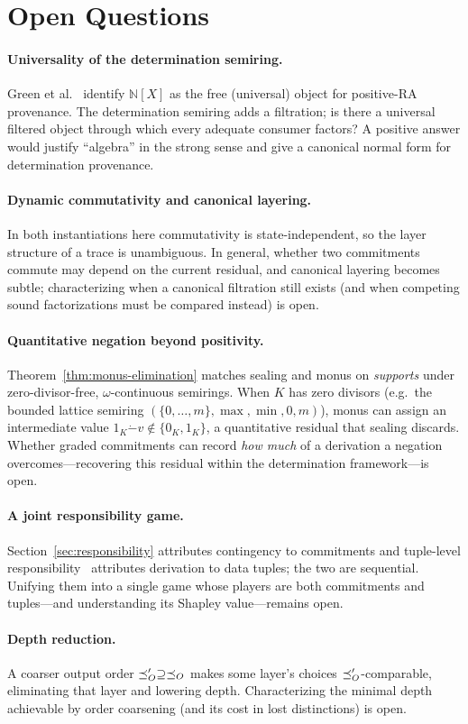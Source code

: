 \section{Open Questions}
\label{app:open-questions}

\paragraph{Universality of the determination semiring.}
Green et al.~\cite{green2007provenance} identify $\mathbb{N}[X]$ as the free
(universal) object for positive-RA provenance. The determination semiring adds
a filtration; is there a universal filtered object through which every
adequate consumer factors? A positive answer would justify ``algebra'' in the
strong sense and give a canonical normal form for determination provenance.

\paragraph{Dynamic commutativity and canonical layering.}
In both instantiations here commutativity is state-independent, so the layer
structure of a trace is unambiguous. In general, whether two commitments
commute may depend on the current residual, and canonical layering becomes
subtle; characterizing when a canonical filtration still exists (and when
competing sound factorizations must be compared instead) is open.

\paragraph{Quantitative negation beyond positivity.}
Theorem~\ref{thm:monus-elimination} matches sealing and monus on
\emph{supports} under zero-divisor-free, $\omega$-continuous semirings. When
$K$ has zero divisors (e.g.\ the bounded lattice semiring
$(\{0,\dots,m\}, \max, \min, 0, m)$), monus can assign an intermediate value
$1_K \mathbin{\dot{-}} v \notin \{0_K, 1_K\}$, a quantitative residual that
sealing discards. Whether graded commitments can record \emph{how much} of a
derivation a negation overcomes---recovering this residual within the
determination framework---is open.

\paragraph{A joint responsibility game.}
Section~\ref{sec:responsibility} attributes contingency to commitments and
tuple-level responsibility~\cite{meliou2010causality} attributes derivation to
data tuples; the two are sequential. Unifying them into a single game whose
players are both commitments and tuples---and understanding its Shapley
value---remains open.

\paragraph{Depth reduction.}
A coarser output order $\preceq_O' \supseteq \preceq_O$ makes some layer's choices
$\preceq_O'$-comparable, eliminating that layer and lowering depth. Characterizing
the minimal depth achievable by order coarsening (and its cost in lost
distinctions) is open.
